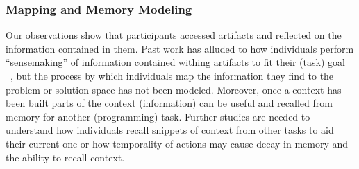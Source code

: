 \subsubsection{Mapping and Memory Modeling}
Our observations show that participants accessed artifacts and reflected on the information contained in them. Past work has alluded to how individuals perform ``sensemaking'' of information contained withing artifacts to fit their (task) goal ~\cite{Pirolli:2005,Grigoreanu:2012}, but the process by which individuals map the information they find to the problem or solution space has not been modeled. Moreover, once a context has been built parts of the context (information) can be useful and recalled from memory for another (programming) task. Further studies are needed to understand how individuals recall snippets of context from other tasks to aid their current one or how temporality of actions may cause decay in memory and the ability to recall context.



